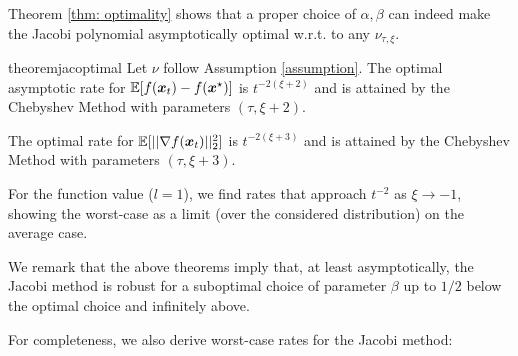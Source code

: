 \documentclass{article}
\begin{document}
Theorem \ref{thm: optimality} shows that a proper choice of $\alpha,\beta$ can indeed make the Jacobi polynomial asymptotically optimal w.r.t. to any $\nu_{\tau,\xi}$. 

\begin{restatable}{theorem}{jacoptimal}\label{thm: optimality}
Let $\nu$ follow Assumption \ref{assumption}.
The optimal asymptotic rate for $\mathbb{E}[f({\boldsymbol x}_t)-f({\boldsymbol x}^\star)]$ is $t^{-2(\xi+2)}$ and is attained by the Chebyshev Method with parameters $(\tau,\xi+2)$. 


The optimal rate for $\mathbb{E}[||\nabla f({\boldsymbol x}_t)||^2_2]$ is $t^{-2(\xi+3)}$ and is attained by the Chebyshev Method with parameters $(\tau,\xi+3)$.
\end{restatable}

For the function value ($l=1$), we find rates that approach $t^{-2}$ as $\xi\rightarrow -1$, showing the worst-case as a limit (over the considered distribution) on the average case.

We remark that the above theorems imply that, at least asymptotically, the Jacobi method is robust for a suboptimal choice of parameter $\beta$ up to $1/2$ below the optimal choice and infinitely above. 


For completeness, we also derive worst-case rates for the Jacobi method:
\end{document}
